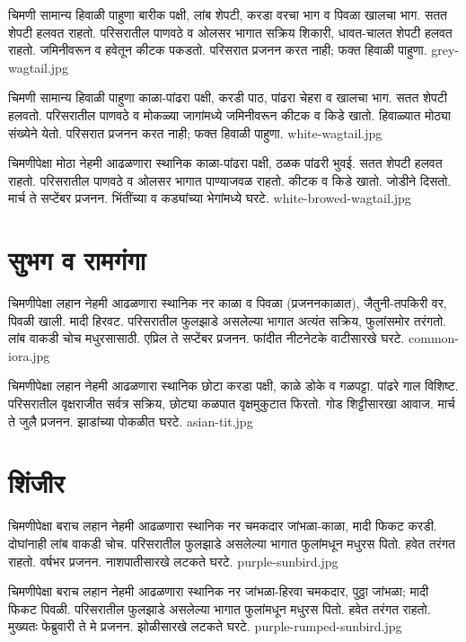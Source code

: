 \documentclass[aspectratio=169]{beamer}
\begin{document}
{चिमणी}
{सामान्य हिवाळी पाहुणा}
{बारीक पक्षी, लांब शेपटी, करडा वरचा भाग व पिवळा खालचा भाग. सतत शेपटी हलवत राहतो.}
{परिसरातील पाणवठे व ओलसर भागात}
{सक्रिय शिकारी, धावत-चालत शेपटी हलवत राहतो. जमिनीवरून व हवेतून कीटक पकडतो.}
{परिसरात प्रजनन करत नाही; फक्त हिवाळी पाहुणा.}
{grey-wagtail.jpg}

{चिमणी}
{सामान्य हिवाळी पाहुणा}
{काळा-पांढरा पक्षी, करडी पाठ, पांढरा चेहरा व खालचा भाग. सतत शेपटी हलवतो.}
{परिसरातील पाणवठे व मोकळ्या जागांमध्ये}
{जमिनीवरून कीटक व किडे खातो. हिवाळ्यात मोठ्या संख्येने येतो.}
{परिसरात प्रजनन करत नाही; फक्त हिवाळी पाहुणा.}
{white-wagtail.jpg}

{चिमणीपेक्षा मोठा}
{नेहमी आढळणारा स्थानिक}
{काळा-पांढरा पक्षी, ठळक पांढरी भुवई. सतत शेपटी हलवत राहतो.}
{परिसरातील पाणवठे व ओलसर भागात}
{पाण्याजवळ राहतो. कीटक व किडे खातो. जोडीने दिसतो.}
{मार्च ते सप्टेंबर प्रजनन. भिंतींच्या व कड्यांच्या भेगांमध्ये घरटे.}
{white-browed-wagtail.jpg}

\section{सुभग व रामगंगा}
{चिमणीपेक्षा लहान}
{नेहमी आढळणारा स्थानिक}
{नर काळा व पिवळा (प्रजननकाळात), जैतुनी-तपकिरी वर, पिवळी खाली. मादी हिरवट.}
{परिसरातील फुलझाडे असलेल्या भागात}
{अत्यंत सक्रिय, फुलांसमोर तरंगतो. लांब वाकडी चोच मधुरसासाठी.}
{एप्रिल ते सप्टेंबर प्रजनन. फांदीत नीटनेटके वाटीसारखे घरटे.}
{common-iora.jpg}

{चिमणीपेक्षा लहान}
{नेहमी आढळणारा स्थानिक}
{छोटा करडा पक्षी, काळे डोके व गळपट्टा. पांढरे गाल विशिष्ट.}
{परिसरातील वृक्षराजीत सर्वत्र}
{सक्रिय, छोट्या कळपात वृक्षमुकुटात फिरतो. गोड शिट्टीसारखा आवाज.}
{मार्च ते जुलै प्रजनन. झाडांच्या पोकळीत घरटे.}
{asian-tit.jpg}

\section{शिंजीर}
{चिमणीपेक्षा बराच लहान}
{नेहमी आढळणारा स्थानिक}
{नर चमकदार जांभळा-काळा, मादी फिकट करडी. दोघांनाही लांब वाकडी चोच.}
{परिसरातील फुलझाडे असलेल्या भागात}
{फुलांमधून मधुरस पितो. हवेत तरंगत राहतो.}
{वर्षभर प्रजनन. नाशपातीसारखे लटकते घरटे.}
{purple-sunbird.jpg}

{चिमणीपेक्षा बराच लहान}
{नेहमी आढळणारा स्थानिक}
{नर जांभळा-हिरवा चमकदार, पुठ्ठा जांभळा; मादी फिकट पिवळी.}
{परिसरातील फुलझाडे असलेल्या भागात}
{फुलांमधून मधुरस पितो. हवेत तरंगत राहतो.}
{मुख्यतः फेब्रुवारी ते मे प्रजनन. झोळीसारखे लटकते घरटे.}
{purple-rumped-sunbird.jpg}
\end{document}
